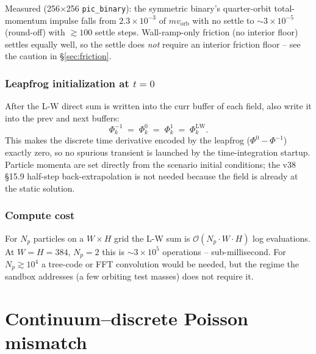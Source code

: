 \documentclass[11pt,a4paper]{article}
\newcommand{\order}[1]{\mathcal{O}(#1)}
\begin{document}
Measured (256$\times$256 \texttt{pic\_binary}): the symmetric binary's
quarter-orbit total-momentum impulse falls from $2.3\times10^{-3}$ of
$m v_\text{orb}$ with no settle to $\sim 3\times10^{-5}$ (round-off)
with $\gtrsim 100$ settle steps.  Wall-ramp-only friction (no interior
floor) settles equally well, so the settle does \emph{not} require an
interior friction floor -- see the caution in \S\ref{sec:friction}.

\subsubsection*{Leapfrog initialization at $t=0$}

After the L-W direct sum is written into the curr buffer of each
field, also write it into the prev and next buffers:
\begin{equation}
  \Phi^{-1}_k \;=\; \Phi^{0}_k \;=\; \Phi^{1}_k \;=\; \Phi^\text{LW}_k.
\end{equation}
This makes the discrete time derivative encoded by the leapfrog
($\Phi^0 - \Phi^{-1}$) exactly zero, so no spurious transient is
launched by the time-integration startup.  Particle momenta are set
directly from the scenario initial conditions; the v38 \S 15.9
half-step back-extrapolation is not needed because the field is
already at the static solution.

\subsubsection*{Compute cost}

For $N_p$ particles on a $W \times H$ grid the L-W sum is
$\order{N_p \cdot W \cdot H}$ log evaluations.  At $W=H=384$, $N_p=2$
this is $\sim 3 \times 10^5$ operations -- sub-millisecond.  For
$N_p \gtrsim 10^4$ a tree-code or FFT convolution would be needed,
but the regime the sandbox addresses (a few orbiting test masses)
does not require it.

\section{Continuum--discrete Poisson mismatch}
\label{sec:lw_discrete}
\end{document}

